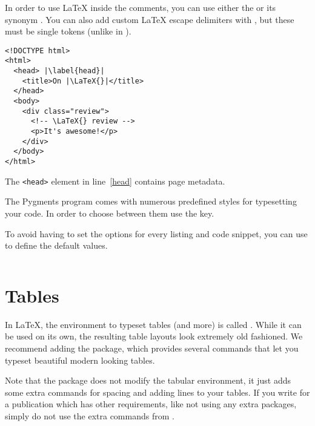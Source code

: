 In order to use \LaTeX{} inside the comments, you can use either the
 or its synonym . You can also add custom
\LaTeX{} escape delimiters with , but these must be single
tokens (unlike in ).
\begin{example}
\begin{verbatim}
<!DOCTYPE html>
<html>
  <head> |\label{head}|
    <title>On |\LaTeX{}|</title>
  </head>
  <body>
    <div class="review">
      <!-- \LaTeX{} review -->
      <p>It's awesome!</p>
    </div>
  </body>
</html>
\end{verbatim}
The \texttt{<head>}
element in line~\ref{head}
contains page metadata.
\end{example}

The Pygments program comes with numerous predefined styles for typesetting your
code. In order to choose between them use the  key.

To avoid having to set the options for every listing and code snippet,
you can use  to define the default values.
\begin{example}
\inputminted{c++}{goodbye.cpp}
\end{example}

\section{Tables}\label{sec:tables}

In \LaTeX{}, the environment to typeset tables (and more) is called
. While it can be used on its own, the resulting table layouts look
extremely old fashioned. We recommend adding the  package, which
provides several commands that let you typeset beautiful modern looking tables.

Note that the  package does not modify the tabular environment,
it just adds some extra commands for spacing and adding lines to your tables.
If you write  for a publication which has other requirements, like not using
any extra packages, simply do not use the extra commands from .

